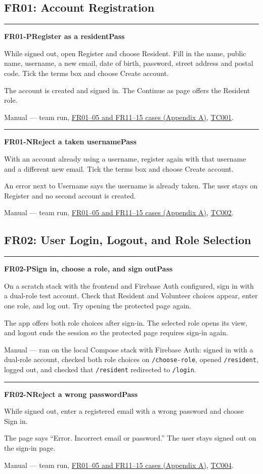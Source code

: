 \documentclass[11pt]{article}
\newcommand{\code}[1]{\texttt{#1}}
\newcommand{\passtag}{\textbf{\color{passgreen}Pass}}
\newcommand{\testcase}[6]{%
  \par\addvspace{10pt}
  \noindent\rule{\linewidth}{0.4pt}\par\nopagebreak
  \phantomsection\label{#1}\textbf{#1\quad #2}\hfill #3\par\nopagebreak
  \begin{description}[style=nextline,leftmargin=1.2em,itemsep=2pt,topsep=2pt,font=\normalfont\itshape]
    \item[Setup and steps] #4
    \item[Expected result] #5
    \item[How it was checked] #6
  \end{description}}
\begin{document}
\subsection{FR01: Account Registration}\label{FR01}
\testcase{FR01-P}{Register as a resident}{\passtag}
  {While signed out, open Register and choose Resident. Fill in the name, public name, username, a new email, date of birth, password, street address and postal code. Tick the terms box and choose Create account.}
  {The account is created and signed in. The Continue as page offers the Resident role.}
  {Manual --- team run, \hyperref[app:A]{FR01--05 and FR11--15 cases (Appendix A)}, \hyperlink{tc:A01}{TC001}.}

\filbreak
\testcase{FR01-N}{Reject a taken username}{\passtag}
  {With an account already using a username, register again with that username and a different new email. Tick the terms box and choose Create account.}
  {An error next to Username says the username is already taken. The user stays on Register and no second account is created.}
  {Manual --- team run, \hyperref[app:A]{FR01--05 and FR11--15 cases (Appendix A)}, \hyperlink{tc:A02}{TC002}.}

\filbreak
\subsection{FR02: User Login, Logout, and Role Selection}\label{FR02}
\testcase{FR02-P}{Sign in, choose a role, and sign out}{\passtag}
  {On a scratch stack with the frontend and Firebase Auth configured, sign in with a dual-role test account. Check that Resident and Volunteer choices appear, enter one role, and log out. Try opening the protected page again.}
  {The app offers both role choices after sign-in. The selected role opens its view, and logout ends the session so the protected page requires sign-in again.}
  {Manual --- ran on the local Compose stack with Firebase Auth: signed in with a dual-role account, checked both role choices on \code{/choose-role}, opened \code{/resident}, logged out, and checked that \code{/resident} redirected to \code{/login}.}

\filbreak
\testcase{FR02-N}{Reject a wrong password}{\passtag}
  {While signed out, enter a registered email with a wrong password and choose Sign in.}
  {The page says “Error. Incorrect email or password.” The user stays signed out on the sign-in page.}
  {Manual --- team run, \hyperref[app:A]{FR01--05 and FR11--15 cases (Appendix A)}, \hyperlink{tc:A04}{TC004}.}
\end{document}

